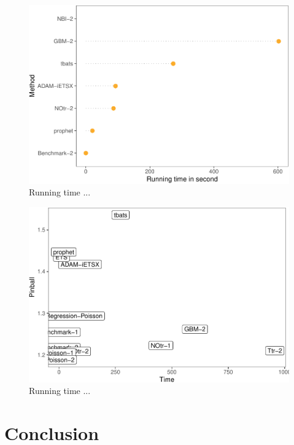 \documentclass[]{elsarticle} %
\begin{document}
\begin{figure}[H]

{\centering \includegraphics[width=0.7\linewidth]{paper_files/figure-latex/time-1} 

}

\caption{Running time ...}\label{fig:time}
\end{figure}

\begin{figure}[H]

{\centering \includegraphics[width=0.7\linewidth]{paper_files/figure-latex/time-accuracy-1} 

}

\caption{Running time ...}\label{fig:time-accuracy}
\end{figure}

\hypertarget{conclusion}{%
\section{Conclusion}\label{conclusion}}

\renewcommand\refname{References}

\end{document}
